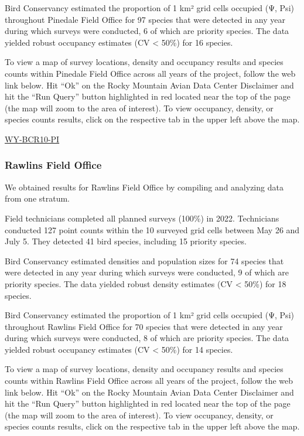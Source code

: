 \documentclass[
  letterpaper,
  DIV=11,
  numbers=noendperiod,
  oneside]{scrreprt}
\begin{document}
Bird Conservancy estimated the proportion of 1 km² grid cells occupied
(Ψ, Psi) throughout Pinedale Field Office for 97 species that were
detected in any year during which surveys were conducted, 6 of which are
priority species. The data yielded robust occupancy estimates (CV
\textless{} 50\%) for 16 species.

To view a map of survey locations, density and occupancy results and
species counts within Pinedale Field Office across all years of the
project, follow the web link below. Hit ``Ok'' on the Rocky Mountain
Avian Data Center Disclaimer and hit the ``Run Query'' button
highlighted in red located near the top of the page (the map will zoom
to the area of interest). To view occupancy, density, or species counts
results, click on the respective tab in the upper left above the map.

\href{http://www.rmbo.org/new_site/adc/QueryWindow.aspx\#N4IgzgLgTghhCuBbEAuABCA6gTQLQCEBhAJQEYAGXABQEl194oBTGeNAewDM0AZGAOwAmaALICYAcyaIm/CGlxoqAS35NBMADZM0AMWVNNwgPKdOygMZMQAXyA==}{WY-BCR10-PI}

\hypertarget{rawlins-field-office}{%
\subsubsection{Rawlins Field Office}\label{rawlins-field-office}}

We obtained results for Rawlins Field Office by compiling and analyzing
data from one stratum.

Field technicians completed all planned surveys (100\%) in 2022.
Technicians conducted 127 point counts within the 10 surveyed grid cells
between May 26 and July 5. They detected 41 bird species, including 15
priority species.

Bird Conservancy estimated densities and population sizes for 74 species
that were detected in any year during which surveys were conducted, 9 of
which are priority species. The data yielded robust density estimates
(CV \textless{} 50\%) for 18 species.

Bird Conservancy estimated the proportion of 1 km² grid cells occupied
(Ψ, Psi) throughout Rawlins Field Office for 70 species that were
detected in any year during which surveys were conducted, 8 of which are
priority species. The data yielded robust occupancy estimates (CV
\textless{} 50\%) for 14 species.

To view a map of survey locations, density and occupancy results and
species counts within Rawlins Field Office across all years of the
project, follow the web link below. Hit ``Ok'' on the Rocky Mountain
Avian Data Center Disclaimer and hit the ``Run Query'' button
highlighted in red located near the top of the page (the map will zoom
to the area of interest). To view occupancy, density, or species counts
results, click on the respective tab in the upper left above the map.
\end{document}
